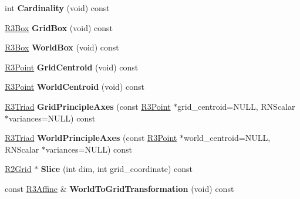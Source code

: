 \begin{DoxyCompactItemize}
\item 
int {\bfseries Cardinality} (void) const \hypertarget{class_r3_grid_a43b6b6ea920d3682fc6d8976722b2b86}{}\label{class_r3_grid_a43b6b6ea920d3682fc6d8976722b2b86}

\item 
\hyperlink{class_r3_box}{R3\+Box} {\bfseries Grid\+Box} (void) const \hypertarget{class_r3_grid_a0220bb241e1811504e791489fe190d94}{}\label{class_r3_grid_a0220bb241e1811504e791489fe190d94}

\item 
\hyperlink{class_r3_box}{R3\+Box} {\bfseries World\+Box} (void) const \hypertarget{class_r3_grid_ad4c53c72856d85f39528bb2afefc93ad}{}\label{class_r3_grid_ad4c53c72856d85f39528bb2afefc93ad}

\item 
\hyperlink{class_r3_point}{R3\+Point} {\bfseries Grid\+Centroid} (void) const \hypertarget{class_r3_grid_a498251035c00a76d170cd8175315706a}{}\label{class_r3_grid_a498251035c00a76d170cd8175315706a}

\item 
\hyperlink{class_r3_point}{R3\+Point} {\bfseries World\+Centroid} (void) const \hypertarget{class_r3_grid_ab6649e77922981d56bafe73d14eec15d}{}\label{class_r3_grid_ab6649e77922981d56bafe73d14eec15d}

\item 
\hyperlink{class_r3_triad}{R3\+Triad} {\bfseries Grid\+Principle\+Axes} (const \hyperlink{class_r3_point}{R3\+Point} $\ast$grid\+\_\+centroid=N\+U\+LL, R\+N\+Scalar $\ast$variances=N\+U\+LL) const \hypertarget{class_r3_grid_a67fa61029dd8c50daa9685e921af1466}{}\label{class_r3_grid_a67fa61029dd8c50daa9685e921af1466}

\item 
\hyperlink{class_r3_triad}{R3\+Triad} {\bfseries World\+Principle\+Axes} (const \hyperlink{class_r3_point}{R3\+Point} $\ast$world\+\_\+centroid=N\+U\+LL, R\+N\+Scalar $\ast$variances=N\+U\+LL) const \hypertarget{class_r3_grid_ad35c0896a09ee3df94469ea767a460af}{}\label{class_r3_grid_ad35c0896a09ee3df94469ea767a460af}

\item 
\hyperlink{class_r2_grid}{R2\+Grid} $\ast$ {\bfseries Slice} (int dim, int grid\+\_\+coordinate) const \hypertarget{class_r3_grid_af0fb6fc03c4a8ab08b91ec83eb4ed163}{}\label{class_r3_grid_af0fb6fc03c4a8ab08b91ec83eb4ed163}

\item 
const \hyperlink{class_r3_affine}{R3\+Affine} \& {\bfseries World\+To\+Grid\+Transformation} (void) const \hypertarget{class_r3_grid_a517ac6a77a7e3f3dc7d9e740a4a301fb}{}\label{class_r3_grid_a517ac6a77a7e3f3dc7d9e740a4a301fb}


\end{DoxyCompactItemize}
